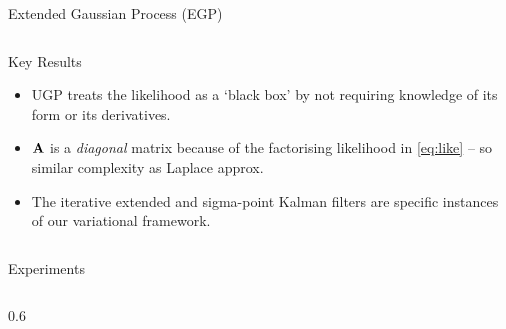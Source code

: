 \documentclass[final]{beamer}
\newlength{\onecolwid}
\newlength{\twocolwid}
\begin{document}
\begin{frame}[t]
\begin{columns}[t]
\begin{column}{\twocolwid}
\begin{columns}[t,totalwidth=\twocolwid]
\begin{column}{\onecolwid}
\begin{block}{Extended Gaussian Process (EGP)}
\end{block}




\end{column} %

\end{columns} %


\begin{alertblock}{Key Results}

\begin{itemize}

    \item UGP %
       treats the likelihood as a `black box' by not requiring knowledge of its form or its derivatives.

    \item $\mathbf{A}$ is a \emph{diagonal} matrix because of the factorising
        likelihood in \eqref{eq:like} -- so similar complexity as Laplace
        approx.

    \item %
        The iterative extended and sigma-point Kalman filters are specific instances of 
        our variational framework.
\end{itemize}

\end{alertblock} 


\vspace{-1.5cm}


\begin{columns}[t,totalwidth=\twocolwid] %
%
%
%
\begin{column}{\twocolwid}
%
%
\begin{block}{Experiments}
%
\begin{columns}
\begin{column}{0.6\twocolwid}%


\end{column}
\end{columns}
\end{block}
\end{column}
\end{columns}
\end{column}
\end{columns}
\end{frame}
\end{document}
